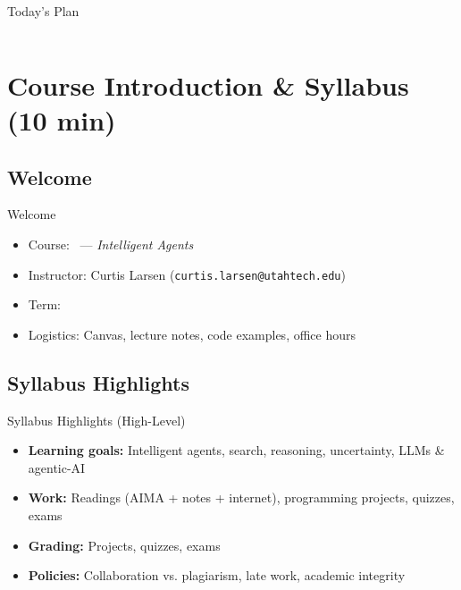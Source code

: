\documentclass[aspectratio=169]{beamer}
\begin{document}
\begin{frame}
  \titlepage
\end{frame}

\begin{frame}{Today’s Plan}
\begin{columns}[t,onlytextwidth]
    \tableofcontents[hideallsubsections,sections={1-4}]
    \tableofcontents[hideallsubsections,sections={5-7}]
\end{columns}
\end{frame}

\section{Course Introduction \& Syllabus (10 min)}

\subsection{Welcome}
\begin{frame}{Welcome}
\begin{itemize}
  \item Course: \course\ — \textit{Intelligent Agents}
  \item Instructor: Curtis Larsen (\texttt{curtis.larsen@utahtech.edu})
  \item Term: \term
  \item Logistics: Canvas, lecture notes, code examples, office hours
\end{itemize}
\end{frame}

\subsection{Syllabus Highlights}
\begin{frame}{Syllabus Highlights (High-Level)}
\begin{itemize}
  \item \textbf{Learning goals:} Intelligent agents, search, reasoning, uncertainty, LLMs \& agentic-AI
  \item \textbf{Work:} Readings (AIMA + notes + internet), programming projects, quizzes, exams
  \item \textbf{Grading:} Projects, quizzes, exams
  \item \textbf{Policies:} Collaboration vs. plagiarism, late work, academic integrity
\end{itemize}
\end{frame}
\end{document}
